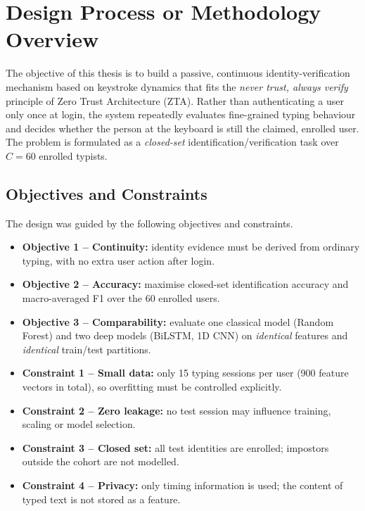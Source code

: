 
\section{Design Process or Methodology Overview}
\label{sec:methodology}

The objective of this thesis is to build a passive, continuous identity-verification mechanism based on keystroke dynamics that fits the \emph{never trust, always verify} principle of Zero Trust Architecture (ZTA). Rather than authenticating a user only once at login, the system repeatedly evaluates fine-grained typing behaviour and decides whether the person at the keyboard is still the claimed, enrolled user. The problem is formulated as a \emph{closed-set} identification/verification task over $C=60$ enrolled typists.

\subsection{Objectives and Constraints}
The design was guided by the following objectives and constraints.

\begin{itemize}
    \item \textbf{Objective 1 -- Continuity:} identity evidence must be derived from ordinary typing, with no extra user action after login.
    \item \textbf{Objective 2 -- Accuracy:} maximise closed-set identification accuracy and macro-averaged F1 over the 60 enrolled users.
    \item \textbf{Objective 3 -- Comparability:} evaluate one classical model (Random Forest) and two deep models (BiLSTM, 1D CNN) on \emph{identical} features and \emph{identical} train/test partitions.
    \item \textbf{Constraint 1 -- Small data:} only 15 typing sessions per user (900 feature vectors in total), so overfitting must be controlled explicitly.
    \item \textbf{Constraint 2 -- Zero leakage:} no test session may influence training, scaling or model selection.
    \item \textbf{Constraint 3 -- Closed set:} all test identities are enrolled; impostors outside the cohort are not modelled.
    \item \textbf{Constraint 4 -- Privacy:} only timing information is used; the content of typed text is not stored as a feature.
\end{itemize}

